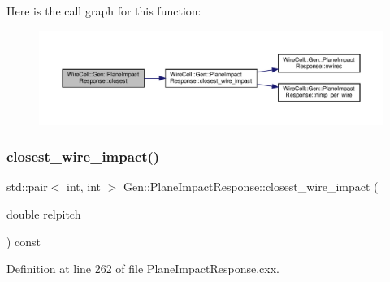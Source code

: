 Here is the call graph for this function\+:
\nopagebreak
\begin{figure}[H]
\begin{center}
\leavevmode
\includegraphics[width=350pt]{class_wire_cell_1_1_gen_1_1_plane_impact_response_a1f0049663133e90f7c3b30f7dda63943_cgraph}
\end{center}
\end{figure}
\mbox{\label{class_wire_cell_1_1_gen_1_1_plane_impact_response_a205df947b332100ddf1179b58b46f47e}} 
\subsubsection{\texorpdfstring{closest\+\_\+wire\+\_\+impact()}{closest\_wire\_impact()}}
{\footnotesize\ttfamily std\+::pair$<$ int, int $>$ Gen\+::\+Plane\+Impact\+Response\+::closest\+\_\+wire\+\_\+impact (\begin{DoxyParamCaption}\item[{double}]{relpitch }\end{DoxyParamCaption}) const}



Definition at line 262 of file Plane\+Impact\+Response.\+cxx.


